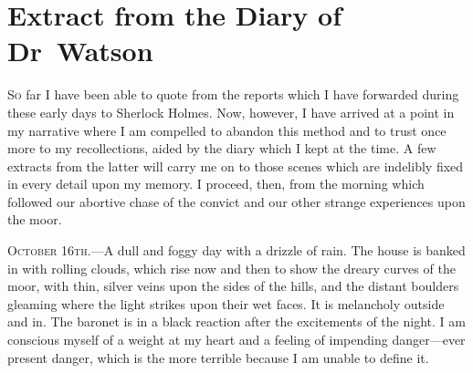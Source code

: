 \chapter{Extract from the Diary of Dr~Watson}
\lettrine{S}{o} far I have been able to quote from the reports which I have forwarded during these early days to Sherlock Holmes. Now, however, I have arrived at a point in my narrative where I am compelled to abandon this method and to trust once more to my recollections, aided by the diary which I kept at the time. A few extracts from the latter will carry me on to those scenes which are indelibly fixed in every detail upon my memory. I proceed, then, from the morning which followed our abortive chase of the convict and our other strange experiences upon the moor.
\vfill

\divider

\textsc{October 16th.}—A dull and foggy day with a drizzle of rain. The house is banked in with rolling clouds, which rise now and then to show the dreary curves of the moor, with thin, silver veins upon the sides of the hills, and the distant boulders gleaming where the light strikes upon their wet faces. It is melancholy outside and in. The baronet is in a black reaction after the excitements of the night. I am conscious myself of a weight at my heart and a feeling of impending danger—ever present danger, which is the more terrible because I am unable to define it.

